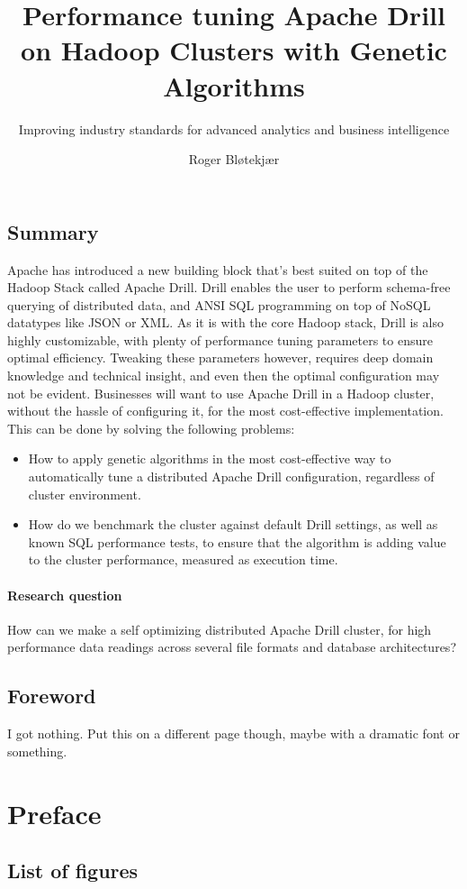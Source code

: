 \documentclass[a4paper,english]{report}
\title{Performance tuning Apache Drill on Hadoop Clusters with Genetic Algorithms}
\subtitle{Improving industry standards for advanced analytics and business intelligence}
\author{Roger Bløtekjær}
\begin{document}
	\duoforside[dept={Institutt for informatikk},
	program={Informatikk: språkteknologi},
	short]
	\section{Summary}
			Apache has introduced a new building block that's best suited on top of the Hadoop Stack called Apache Drill. Drill enables the user to perform schema-free querying of distributed data, and ANSI SQL programming on top of NoSQL datatypes like JSON or XML. As it is with the core Hadoop stack, Drill is also highly customizable, with plenty of performance tuning parameters to ensure optimal efficiency. Tweaking these parameters however, requires deep domain knowledge and technical insight, and even then the optimal configuration may not be evident. Businesses will want to use Apache Drill in a Hadoop cluster, without the hassle of configuring it, for the most cost-effective implementation. This can be done by solving the following problems:
	\begin{itemize}
		\item How to apply genetic algorithms in the most cost-effective way to automatically tune a distributed Apache Drill configuration, regardless of cluster environment.
		\item How do we benchmark the cluster against default Drill settings, as well as known SQL performance tests, to ensure that the algorithm is adding value to the cluster performance, measured as execution time.
	\end{itemize}
	\subsubsection{Research question}
	How can we make a self optimizing distributed Apache Drill cluster, for high performance data readings across several file formats and database architectures?
	\section{Foreword}
	I got nothing. Put this on a different page though, maybe with a dramatic font or something.
	
	\tableofcontents
	
	\chapter{Preface}
	\section{List of figures}
\end{document}
